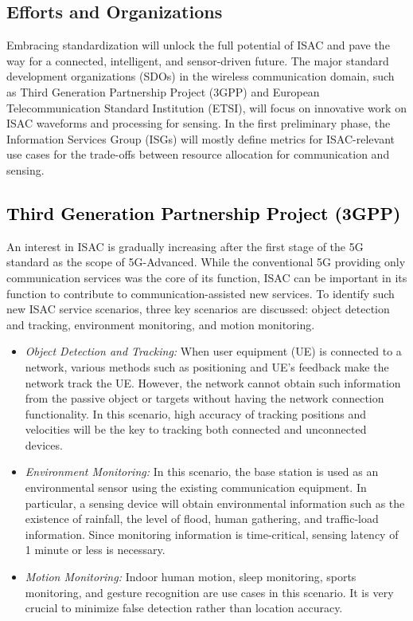 \documentclass[journal, comsoc]{IEEEtran}
\begin{document}
\subsection{Efforts and Organizations} 
\label{sec:3.1}

Embracing standardization will unlock the full potential of ISAC and pave the way for a connected, intelligent, and sensor-driven future. The major standard development organizations (SDOs) in the wireless communication domain, such as Third Generation Partnership Project (3GPP) and European Telecommunication Standard Institution (ETSI), will focus on innovative work on ISAC waveforms and processing for sensing. In the first preliminary phase, the Information Services Group (ISGs) will mostly define metrics for ISAC-relevant use cases for the trade-offs between resource allocation for communication and sensing. 

\subsection{\textcolor{black}{Third Generation Partnership Project (3GPP)}}
\label{sec:3.1}
An interest in ISAC is gradually increasing after the first stage of the 5G standard as the scope of 5G-Advanced. While the conventional 5G providing only communication services was the core of its function, ISAC can be important in its function to contribute to communication-assisted new services. To identify such new ISAC service scenarios, three key scenarios are discussed: object detection and tracking, environment monitoring, and motion monitoring.
\begin{itemize}
    \item \emph{Object Detection and Tracking:} When user equipment (UE) is connected to a network, various methods such as positioning and UE’s feedback make the network track the UE. However, the network cannot obtain such information from the passive object or targets without having the network connection functionality. In this scenario, high accuracy of tracking positions and velocities will be the key to tracking both connected and unconnected devices.
    \item \emph{Environment Monitoring:} In this scenario, the base station is used as an environmental sensor using the existing communication equipment. In particular, a sensing device will obtain environmental information such as the existence of rainfall, the level of flood, human gathering, and traffic-load information. Since monitoring information is time-critical, sensing latency of 1 minute or less is necessary.
    \item \emph{Motion Monitoring:} Indoor human motion, sleep monitoring, sports monitoring, and gesture recognition are use cases in this scenario. It is very crucial to minimize false detection rather than location accuracy.
\end{itemize}
\end{document}
